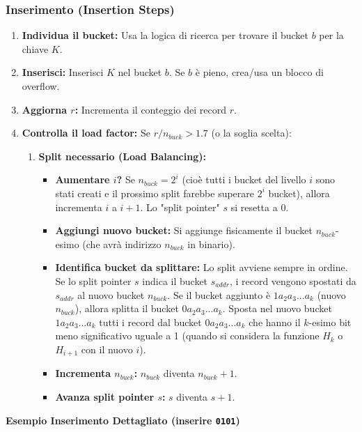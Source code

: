\subsubsection{Inserimento (Insertion Steps)}
\begin{enumerate}
    \item \textbf{Individua il bucket:} Usa la logica di ricerca per trovare il bucket $b$ per la chiave $K$.
    \item \textbf{Inserisci:} Inserisci $K$ nel bucket $b$. Se $b$ è pieno, crea/usa un blocco di overflow.
    \item \textbf{Aggiorna $r$:} Incrementa il conteggio dei record $r$.
    \item \textbf{Controlla il load factor:} Se $r / n_{buck} > 1.7$ (o la soglia scelta):
    \begin{enumerate}
        \item \textbf{Split necessario (Load Balancing):}
        \begin{itemize}
            \item \textbf{Aumentare $i$?} Se $n_{buck} = 2^i$ (cioè tutti i bucket del livello $i$ sono stati creati e il prossimo split farebbe superare $2^i$ bucket), allora incrementa $i$ a $i+1$. Lo "split pointer" $s$ si resetta a 0.
            \item \textbf{Aggiungi nuovo bucket:} Si aggiunge fisicamente il bucket $n_{buck}$-esimo (che avrà indirizzo $n_{buck}$ in binario).
            \item \textbf{Identifica bucket da splittare:} Lo split avviene sempre in ordine. Se lo split pointer $s$ indica il bucket $s_{addr}$, i record vengono spostati da $s_{addr}$ al nuovo bucket $n_{buck}$. Se il bucket aggiunto è $1a_2a_3...a_k$ (nuovo $n_{buck}$), allora splitta il bucket $0a_2a_3...a_k$. Sposta nel nuovo bucket $1a_2a_3...a_k$ tutti i record dal bucket $0a_2a_3...a_k$ che hanno il $k$-esimo bit meno significativo uguale a 1 (quando si considera la funzione $H_k$ o $H_{i+1}$ con il nuovo $i$).
            \item \textbf{Incrementa $n_{buck}$:} $n_{buck}$ diventa $n_{buck} + 1$.
            \item \textbf{Avanza split pointer $s$:} $s$ diventa $s+1$.
        \end{itemize}
    \end{enumerate}
\end{enumerate}

\textbf{Esempio Inserimento Dettagliato (inserire \texttt{0101})}

